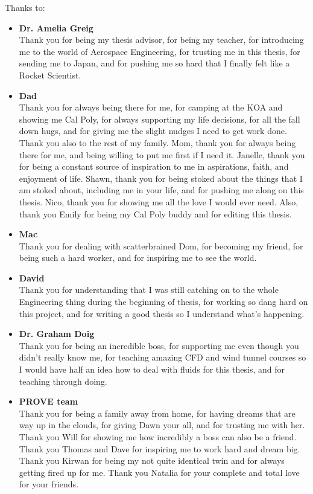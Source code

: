 \noindent
Thanks to:
\begin{itemize}
    \item \textbf{Dr. Amelia Greig} \\
    Thank you for being my thesis advisor, for being my teacher, for introducing me to the world of Aerospace Engineering, for trusting me in this thesis, for sending me to Japan, and for pushing me so hard that I finally felt like a Rocket Scientist.
    \item \textbf{Dad} \\
    Thank you for always being there for me, for camping at the KOA and showing me Cal Poly, for always supporting my life decisions, for all the fall down hugs, and for giving me the slight nudges I need to get work done. Thank you also to the rest of my family. Mom, thank you for always being there for me, and being willing to put me first if I need it. Janelle, thank you for being a constant source of inspiration to me in aspirations, faith, and enjoyment of life. Shawn, thank you for being stoked about the things that I am stoked about, including me in your life, and for pushing me along on this thesis. Nico, thank you for showing me all the love I would ever need. Also, thank you Emily for being my Cal Poly buddy and for editing this thesis.
    \item \textbf{Mac} \\
    Thank you for dealing with scatterbrained Dom, for becoming my friend, for being such a hard worker, and for inspiring me to see the world.
    \item \textbf{David}\\
    Thank you for understanding that I was still catching on to the whole Engineering thing during the beginning of thesis, for working so dang hard on this project, and for writing a good thesis so I understand what's happening. 
    \item  \textbf{Dr. Graham Doig}\\
    Thank you for being an incredible boss, for supporting me even though you didn't really know me, for teaching amazing CFD and wind tunnel courses so I would have half an idea how to deal with fluids for this thesis, and for teaching through doing.
    \item \textbf{PROVE team}\\
    Thank you for being a family away from home, for having dreams that are way up in the clouds, for giving Dawn your all, and for trusting me with her. Thank you Will for showing me how incredibly a boss can also be a friend. Thank you Thomas and Dave for inspiring me to work hard and dream big. Thank you Kirwan for being my not quite identical twin and for always getting fired up for me. Thank you Natalia for your complete and total love for your friends.

\end{itemize}

